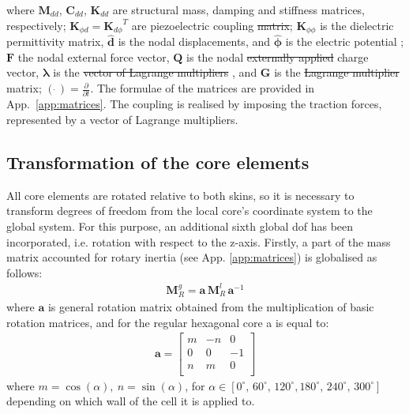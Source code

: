 \documentclass[materials,article,submit,moreauthors,pdftex]{Definitions/mdpi}
\providecommand{\DIFadd}[1]{{\protect\color{blue}{#1}}} %
\providecommand{\DIFdel}[1]{{\protect\color{red}\sout{#1}}}                      %
\providecommand{\DIFaddbegin}{} %
\providecommand{\DIFaddend}{} %
\providecommand{\DIFdelbegin}{} %
\providecommand{\DIFdelend}{} %
\begin{document}
\DIFaddend where \(\textbf{M}_{dd}\), \(\textbf{C}_{dd}\), \(\textbf{K}_{dd}\) are structural mass, damping and stiffness matrices, respectively; \(\textbf{K}_{\phi d}={\textbf{K}_{d\phi}}^T\) are piezoelectric coupling \DIFdelbegin \DIFdel{matrix}\DIFdelend \DIFaddbegin \DIFadd{matrices}\DIFaddend ; \(\textbf{K}_{\phi \phi}\) is the dielectric permittivity matrix, \(\widehat{\textbf{d}}\) is the \DIFaddbegin \DIFadd{vector of unknown }\DIFaddend nodal displacements, and \(\widehat{\boldsymbol{\phi}}\) is the electric potential \DIFaddbegin \DIFadd{vector}\DIFaddend ; \(\textbf{F}\) the nodal external force vector, \(\textbf{Q}\) is the nodal \DIFdelbegin \DIFdel{externally applied }\DIFdelend charge vector, \(\boldsymbol{\lambda}\) is the \DIFdelbegin \DIFdel{vector of Lagrange multipliers }\DIFdelend \DIFaddbegin \DIFadd{Lagrange multipliers vector}\DIFaddend , and \(\textbf{G}\) is the \DIFdelbegin \DIFdel{Lagrange multiplier }\DIFdelend \DIFaddbegin \DIFadd{interface coupling }\DIFaddend matrix; \((\dot{\ })=\frac{\partial}{\partial t}\).
The formulae of the matrices are provided in App.~\ref{app:matrices}.
The coupling is realised by imposing the traction forces, represented by a vector of Lagrange multipliers. 

\subsection{Transformation of the core elements}
\label{sec:transformation}
All core elements are rotated relative to both skins, so it is necessary to transform degrees of freedom from the local core's coordinate system to the global system.
For this purpose, an additional sixth global dof has been incorporated, i.e. rotation with respect to the z-axis.
Firstly, a part of the mass matrix accounted for rotary inertia (see App. \ref{app:matrices}) is globalised as follows:
\begin{eqnarray}
\textbf{M}_R^g=\textbf{a}\,\textbf{M}_R^l\,\textbf{a}^{-1}
\label{eq:inertia}
\end{eqnarray}
where \(\textbf{a}\) is general rotation matrix obtained from the multiplication of basic rotation matrices, and for the regular hexagonal core a is equal to:
\begin{eqnarray}
\textbf{a}=\left [ 
\begin{array}{ccc}
m & -n & 0\\
0 & 0 & -1\\
n & m & 0\\
\end{array}
\right ]
\label{eq:rotation}
\end{eqnarray}
where \(m=\cos(\alpha),\:n=\sin(\alpha)\), for \(\alpha\in{[0^\circ,\,60^\circ,\,120^\circ,180^\circ,\,240^\circ,\,300^\circ]}\) depending on which wall of the cell it is applied to.
\end{document}
